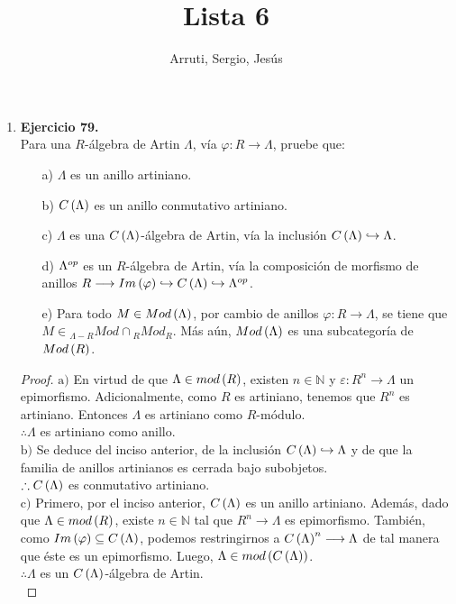 \documentclass{article}
\title{Lista 6}
\author{Arruti, Sergio, Jesús}
\date{}
\begin{document}
\maketitle

\begin{enumerate}
	\item \textbf{Ejercicio 79.}\\
	Para una $R$-álgebra de Artin $\Lambda$, vía $\varphi : R \longrightarrow \Lambda$, pruebe que:
	\begin{itemize}
		\item[a)] $\Lambda$ es un anillo artiniano.
		\item[b)] $C\left(\Lambda\right)$ es un anillo conmutativo artiniano.
		\item[c)] $\Lambda$ es una $C\left(\Lambda\right)$-álgebra de Artin, vía la inclusión $C\left(\Lambda\right)\hookrightarrow\Lambda$.
		\item[d)] ${\Lambda}^{op}$ es un $R$-álgebra de Artin, vía la composición de morfismo de anillos $R \longrightarrow Im\left(\varphi\right)\hookrightarrow C\left(\Lambda\right)\hookrightarrow{\Lambda}^{op}$.
		\item[e)] Para todo $M \in Mod\left(\Lambda\right)$, por cambio de anillos $\varphi : R \longrightarrow \Lambda$, se tiene que $M \in {}_{\Lambda - R}Mod \cap {}_{R}Mod_{R}$. Más aún, $Mod\left(\Lambda\right)$ es una subcategoría de $Mod\left(R\right)$.
	\end{itemize}
	\begin{proof}
		$\boxed{\text{a)}}$ En virtud de que $\Lambda \in mod\left(R\right)$, existen $n\in\mathbb{N}$ y $\varepsilon:R^{n}\longrightarrow\Lambda$ un epimorfismo. Adicionalmente, como $R$ es artiniano, tenemos que $R^{n}$ es artiniano. Entonces $\Lambda$ es artiniano como $R$-módulo.\\
		$\therefore\Lambda$ es artiniano como anillo.\\
		
		$\boxed{\text{b)}}$ Se deduce del inciso anterior, de la inclusión $C\left(\Lambda\right)\hookrightarrow\Lambda$ y de que la familia de anillos artinianos es cerrada bajo subobjetos.\\
		$\therefore C\left(\Lambda\right)$ es conmutativo artiniano.\\
		
		$\boxed{\text{c)}}$ Primero, por el inciso anterior, $C\left(\Lambda\right)$ es un anillo artiniano. Además, dado que $\Lambda \in mod\left(R\right)$, existe $n\in\mathbb{N}$ tal que $R^{n}\longrightarrow\Lambda$ es epimorfismo. También, como $Im\left(\varphi\right)\subseteq C\left(\Lambda\right)$, podemos restringirnos a $C\left(\Lambda\right)^{n}\longrightarrow\Lambda$ de tal manera que éste es un epimorfismo. Luego, $\Lambda \in mod\left(C\left(\Lambda\right)\right)$.\\
		$\therefore\Lambda$ es un $C\left(\Lambda\right)$-álgebra de Artin.\\
		

\end{proof}
\end{enumerate}
\end{document}

